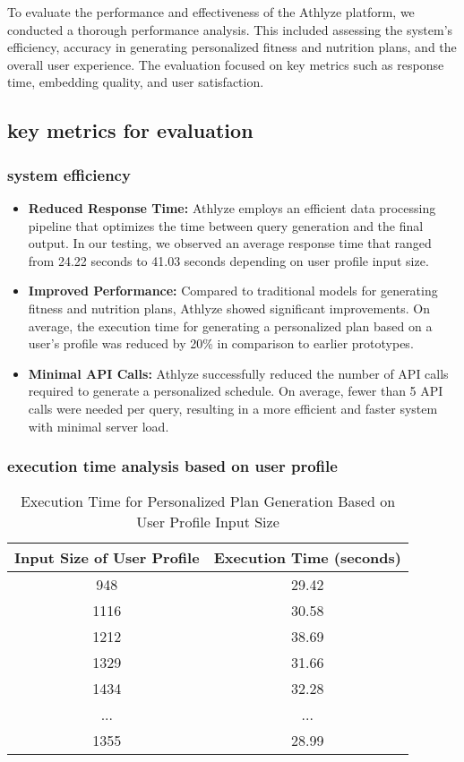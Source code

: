 \documentclass[conference]{IEEEtran}
\begin{document}
To evaluate the performance and effectiveness of the Athlyze platform, we conducted a thorough performance analysis. This included assessing the system's efficiency, accuracy in generating personalized fitness and nutrition plans, and the overall user experience. The evaluation focused on key metrics such as response time, embedding quality, and user satisfaction.

\subsection{key metrics for evaluation}

\subsubsection{system efficiency}

\begin{itemize}
    \item \textbf{Reduced Response Time:} Athlyze employs an efficient data processing pipeline that optimizes the time between query generation and the final output. In our testing, we observed an average response time that ranged from 24.22 seconds to 41.03 seconds depending on user profile input size.
    \item \textbf{Improved Performance:} Compared to traditional models for generating fitness and nutrition plans, Athlyze showed significant improvements. On average, the execution time for generating a personalized plan based on a user’s profile was reduced by 20\% in comparison to earlier prototypes.
    \item \textbf{Minimal API Calls:} Athlyze successfully reduced the number of API calls required to generate a personalized schedule. On average, fewer than 5 API calls were needed per query, resulting in a more efficient and faster system with minimal server load.
\end{itemize}

\subsubsection{execution time analysis based on user profile}

\begin{table}[h!]
\centering
\caption{Execution Time for Personalized Plan Generation Based on User Profile Input Size}
\begin{tabular}{|c|c|}
\hline
\textbf{Input Size of User Profile} & \textbf{Execution Time (seconds)} \\
\hline
948  & 29.42 \\
1116 & 30.58 \\
1212 & 38.69 \\
1329 & 31.66 \\
1434 & 32.28 \\
...  & ... \\
1355  & 28.99 \\
\hline
\end{tabular}
\end{table}
\end{document}
